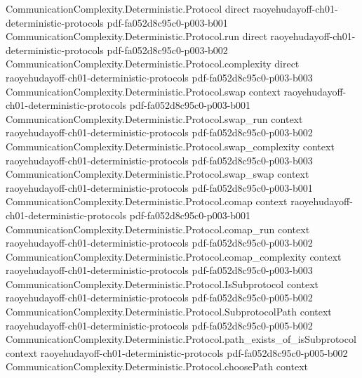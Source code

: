 \begin{theorem}
\label{CommunicationComplexity.Functions.Disjointness.foolingSet_card}
\leanok
{}
\proofstep
  {CommunicationComplexity.Deterministic.Protocol}
  {direct}
  {raoyehudayoff-ch01-deterministic-protocols}
  {pdf-fa052d8c95c0-p003-b001}
\proofstep
  {CommunicationComplexity.Deterministic.Protocol.run}
  {direct}
  {raoyehudayoff-ch01-deterministic-protocols}
  {pdf-fa052d8c95c0-p003-b002}
\proofstep
  {CommunicationComplexity.Deterministic.Protocol.complexity}
  {direct}
  {raoyehudayoff-ch01-deterministic-protocols}
  {pdf-fa052d8c95c0-p003-b003}
\proofstep
  {CommunicationComplexity.Deterministic.Protocol.swap}
  {context}
  {raoyehudayoff-ch01-deterministic-protocols}
  {pdf-fa052d8c95c0-p003-b001}
\proofstep
  {CommunicationComplexity.Deterministic.Protocol.swap_run}
  {context}
  {raoyehudayoff-ch01-deterministic-protocols}
  {pdf-fa052d8c95c0-p003-b002}
\proofstep
  {CommunicationComplexity.Deterministic.Protocol.swap_complexity}
  {context}
  {raoyehudayoff-ch01-deterministic-protocols}
  {pdf-fa052d8c95c0-p003-b003}
\proofstep
  {CommunicationComplexity.Deterministic.Protocol.swap_swap}
  {context}
  {raoyehudayoff-ch01-deterministic-protocols}
  {pdf-fa052d8c95c0-p003-b001}
\proofstep
  {CommunicationComplexity.Deterministic.Protocol.comap}
  {context}
  {raoyehudayoff-ch01-deterministic-protocols}
  {pdf-fa052d8c95c0-p003-b001}
\proofstep
  {CommunicationComplexity.Deterministic.Protocol.comap_run}
  {context}
  {raoyehudayoff-ch01-deterministic-protocols}
  {pdf-fa052d8c95c0-p003-b002}
\proofstep
  {CommunicationComplexity.Deterministic.Protocol.comap_complexity}
  {context}
  {raoyehudayoff-ch01-deterministic-protocols}
  {pdf-fa052d8c95c0-p003-b003}
\proofstep
  {CommunicationComplexity.Deterministic.Protocol.IsSubprotocol}
  {context}
  {raoyehudayoff-ch01-deterministic-protocols}
  {pdf-fa052d8c95c0-p005-b002}
\proofstep
  {CommunicationComplexity.Deterministic.Protocol.SubprotocolPath}
  {context}
  {raoyehudayoff-ch01-deterministic-protocols}
  {pdf-fa052d8c95c0-p005-b002}
\proofstep
  {CommunicationComplexity.Deterministic.Protocol.path_exists_of_isSubprotocol}
  {context}
  {raoyehudayoff-ch01-deterministic-protocols}
  {pdf-fa052d8c95c0-p005-b002}
\proofstep
  {CommunicationComplexity.Deterministic.Protocol.choosePath}
  {context}

\end{theorem}
